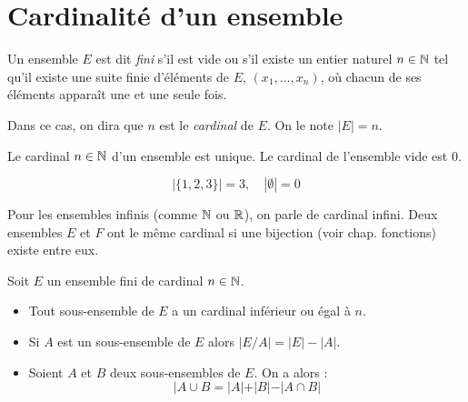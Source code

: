\section{Cardinalité d'un ensemble}

\begin{definition}
    Un ensemble $E$ est dit \emph{fini} s'il est vide ou s'il existe un entier naturel $n \in \mathbb{N}$ 
    tel qu'il existe une suite finie d'éléments de $E$, $(x_1, \dots, x_n)$, où chacun de ses éléments 
    apparaît une et une seule fois. 

    Dans ce cas, on dira que $n$ est le \emph{cardinal} de $E$. On le note $|E| = n$.
\end{definition}

\begin{proposition}
    Le cardinal $n \in \mathbb{N}$ d'un ensemble est unique. 
    Le cardinal de l'ensemble vide est 0. 
\end{proposition}

\begin{example}
    \[
        | \{1,2,3\} | = 3, \quad | \emptyset | = 0
    \]
\end{example}

\begin{remark}
    Pour les ensembles infinis (comme $\mathbb{N}$ ou $\mathbb{R}$), on parle de cardinal infini. 
    Deux ensembles $E$ et $F$ ont le même cardinal si une bijection (voir chap. fonctions) existe entre eux.
\end{remark}

\begin{prop}
    Soit $E$ un ensemble fini de cardinal $n \in \mathbb{N}$.
    \begin{itemize}
        \item Tout sous-ensemble de $E$ a un cardinal inférieur ou égal à $n$. 
        \item Si $A$ est un sous-ensemble de $E$ alors $|E/A| = |E|-|A|$. 
        \item Soient $A$ et $B$ deux sous-ensembles de $E$. On a alors : 
            \[ \boxed{| A \cup B = |A| + |B| - | A \cap B |} \] 
    \end{itemize}

\end{prop}
